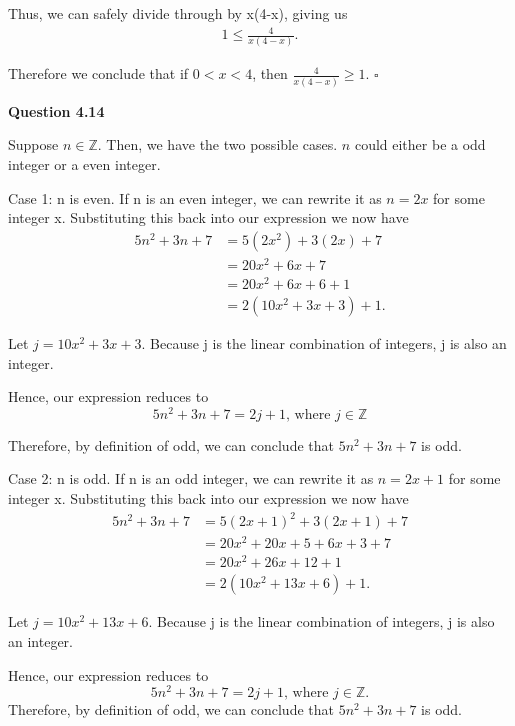 \documentclass[12pt]{article}
\begin{document}
Thus, we can safely divide through by x(4-x), giving us
\begin{align*}
    1 \leq{\frac{4}{x(4-x)}}.
\end{align*}

Therefore we conclude that if $0 < x < 4$, then $\frac{4}{x(4 - x)} \geq 1$. $\square{}$

\vspace{50pt}

\noindent \textbf{Question 4.14}

Suppose $n \in{\mathbb{Z}}$. Then, we have the two possible cases.
$n$ could either be a odd integer or a even integer.
\vspace{4pt}

Case 1: n is even. If n is an even integer, we can rewrite it as $n = 2x$ for some integer x.
Substituting this back into our expression we now have
\begin{align*}
    5n^2 +3n + 7 & = 5(2x^2) + 3(2x) + 7    \\
                 & = 20x^2 + 6x + 7         \\
                 & = 20x^2 + 6x + 6 + 1     \\
                 & = 2(10x^2 + 3x + 3) + 1.
\end{align*}

Let $j = 10x^2 + 3x + 3$. Because j is the linear combination of integers, j is also an integer.


Hence, our expression reduces to
\[
    5n^2 +3n + 7 = 2j+1 \text{, where } j\in{\mathbb{Z}}
\]

Therefore, by definition of odd, we can conclude that $5n^2 +3n + 7$ is odd.
\vspace{8pt}

Case 2: n is odd. If n is an odd integer, we can rewrite it as $n = 2x+1$ for some integer x.
Substituting this back into our expression we now have
\begin{align*}
    5n^2 +3n + 7 & = 5(2x+1)^2 + 3(2x+1) + 7      \\
                 & = 20x^2 + 20x + 5 + 6x + 3 + 7 \\
                 & = 20x^2 + 26x + 12 + 1         \\
                 & = 2(10x^2 + 13x + 6) + 1.
\end{align*}

Let $j = 10x^2 + 13x + 6$. Because j is the linear combination of integers, j is also an integer.

Hence, our expression reduces to
\[
    5n^2 +3n + 7 = 2j+1 \text{, where } j\in{\mathbb{Z}}.
\]
Therefore, by definition of odd, we can conclude that $5n^2 +3n + 7$ is odd.
\vspace{8pt}
\end{document}
